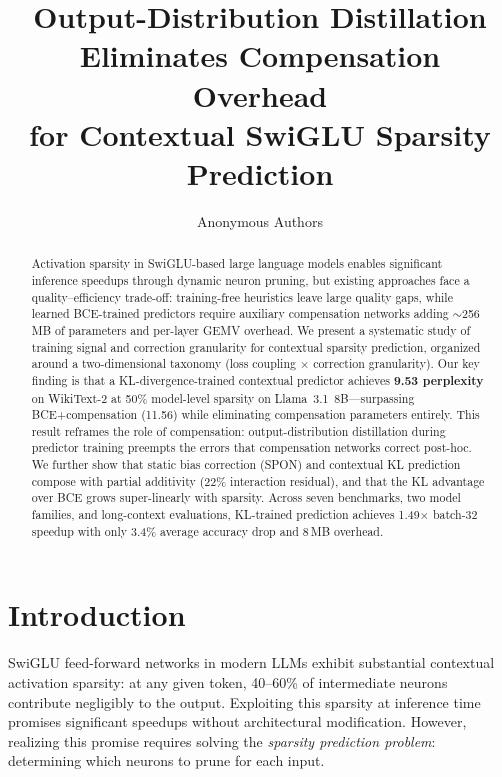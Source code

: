 \documentclass[11pt]{article}
\title{Output-Distribution Distillation Eliminates Compensation Overhead\\for Contextual SwiGLU Sparsity Prediction}
\author{
  Anonymous Authors
}
\date{}
\begin{document}
\maketitle

\begin{abstract}
Activation sparsity in SwiGLU-based large language models enables significant inference speedups through dynamic neuron pruning, but existing approaches face a quality--efficiency trade-off: training-free heuristics leave large quality gaps, while learned BCE-trained predictors require auxiliary compensation networks adding ${\sim}$256\,MB of parameters and per-layer GEMV overhead. We present a systematic study of training signal and correction granularity for contextual sparsity prediction, organized around a two-dimensional taxonomy (loss coupling $\times$ correction granularity). Our key finding is that a KL-divergence-trained contextual predictor achieves \textbf{9.53 perplexity} on WikiText-2 at 50\% model-level sparsity on Llama~3.1~8B---surpassing BCE+compensation (11.56) while eliminating compensation parameters entirely. This result reframes the role of compensation: output-distribution distillation during predictor training preempts the errors that compensation networks correct post-hoc. We further show that static bias correction (SPON) and contextual KL prediction compose with partial additivity (22\% interaction residual), and that the KL advantage over BCE grows super-linearly with sparsity. Across seven benchmarks, two model families, and long-context evaluations, KL-trained prediction achieves 1.49$\times$ batch-32 speedup with only 3.4\% average accuracy drop and 8\,MB overhead.
\end{abstract}

\section{Introduction}

SwiGLU feed-forward networks in modern LLMs exhibit substantial contextual activation sparsity: at any given token, 40--60\% of intermediate neurons contribute negligibly to the output. Exploiting this sparsity at inference time promises significant speedups without architectural modification. However, realizing this promise requires solving the \emph{sparsity prediction problem}: determining which neurons to prune for each input.
\end{document}
